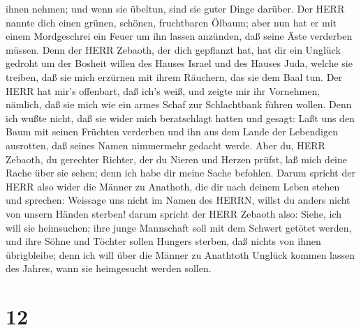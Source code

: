 ihnen nehmen; und wenn sie übeltun, sind sie guter Dinge darüber.
 Der HERR nannte dich einen grünen, schönen, fruchtbaren
Ölbaum; aber nun hat er mit einem Mordgeschrei ein Feuer um ihn lassen
anzünden, daß seine Äste verderben müssen.  Denn der HERR
Zebaoth, der dich gepflanzt hat, hat dir ein Unglück gedroht um der
Bosheit willen des Hauses Israel und des Hauses Juda, welche sie
treiben, daß sie mich erzürnen mit ihrem Räuchern, das sie dem Baal tun.
 Der HERR hat mir's offenbart, daß ich's weiß, und zeigte
mir ihr Vornehmen,  nämlich, daß sie mich wie ein armes
Schaf zur Schlachtbank führen wollen. Denn ich wußte nicht, daß sie
wider mich beratschlagt hatten und gesagt: Laßt uns den Baum mit seinen
Früchten verderben und ihn aus dem Lande der Lebendigen ausrotten, daß
seines Namen nimmermehr gedacht werde.  Aber du, HERR
Zebaoth, du gerechter Richter, der du Nieren und Herzen prüfst, laß mich
deine Rache über sie sehen; denn ich habe dir meine Sache befohlen.
 Darum spricht der HERR also wider die Männer zu Anathoth,
die dir nach deinem Leben stehen und sprechen: Weissage uns nicht im
Namen des HERRN, willst du anders nicht von unsern Händen sterben!
 darum spricht der HERR Zebaoth also: Siehe, ich will sie
heimsuchen; ihre junge Mannschaft soll mit dem Schwert getötet werden,
und ihre Söhne und Töchter sollen Hungers sterben, daß nichts von ihnen
übrigbleibe;  denn ich will über die Männer zu Anathtoth
Unglück kommen lassen des Jahres, wann sie heimgesucht werden sollen.

\hypertarget{section-11}{%
\section{12}\label{section-11}}


